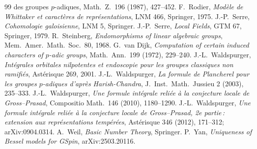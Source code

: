 \begin{thebibliography}{99}
{  des groupes $p$-adiques}, Math.\ Z.\ 196 (1987), 427--452.
 F.~Rodier, \emph{Mod\`ele de Whittaker et caract\`eres de repr\'esentations},
  LNM 466, Springer, 1975.
 J.-P.~Serre, \emph{Cohomologie galoisienne}, LNM 5, Springer.
 J.-P.~Serre, \emph{Local Fields}, GTM 67, Springer, 1979.
 R.~Steinberg, \emph{Endomorphisms of linear algebraic groups}, Mem.\ Amer.\ Math.\
  Soc.\ 80, 1968.
 G.~van Dijk, \emph{Computation of certain induced characters of $p$-adic groups},
  Math.\ Ann.\ 199 (1972), 229--240.
 J.-L.~Waldspurger, \emph{Int\'egrales orbitales nilpotentes et endoscopie pour les
  groupes classiques non ramifi\'es}, Ast\'erisque 269, 2001.
 J.-L.~Waldspurger, \emph{La formule de Plancherel pour les groupes $p$-adiques
  d'apr\`es Harish-Chandra}, J.\ Inst.\ Math.\ Jussieu 2 (2003), 235--333.
\bibitem{Wal10} J.-L.~Waldspurger, \emph{Une formule int\'egrale reli\'ee \`a la conjecture locale de
  Gross--Prasad}, Compositio Math.\ 146 (2010), 1180--1290.
 J.-L.~Waldspurger, \emph{Une formule int\'egrale reli\'ee \`a la conjecture locale de
Gross--Prasad, 2e partie\,: extension aux repr\'esentations temp\'er\'ees}, Ast\'erisque 346 (2012), 171--312;
arXiv:0904.0314.
 A.~Weil, \emph{Basic Number Theory}, Springer.
 P.~Yan, \emph{Uniqueness of Bessel models for GSpin}, arXiv:2503.20116.
\end{thebibliography}
